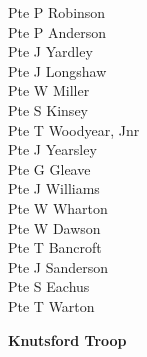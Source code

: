 \begin{multicols}{2}
  Pte P Robinson \\
  Pte P Anderson \\
  Pte J Yardley \\
  Pte J Longshaw \\
  Pte W Miller \\
  Pte S Kinsey \\
  Pte T Woodyear, Jnr \\
  Pte J Yearsley \\
  Pte G Gleave \\
  Pte J Williams \\
  Pte W Wharton \\
  Pte W Dawson \\
  Pte T Bancroft \\
  Pte J Sanderson \\
  Pte S Eachus \\
  Pte T Warton \\
\end{multicols}

\begin{center}
  \Large
  \textbf{Knutsford Troop}
\end{center}

